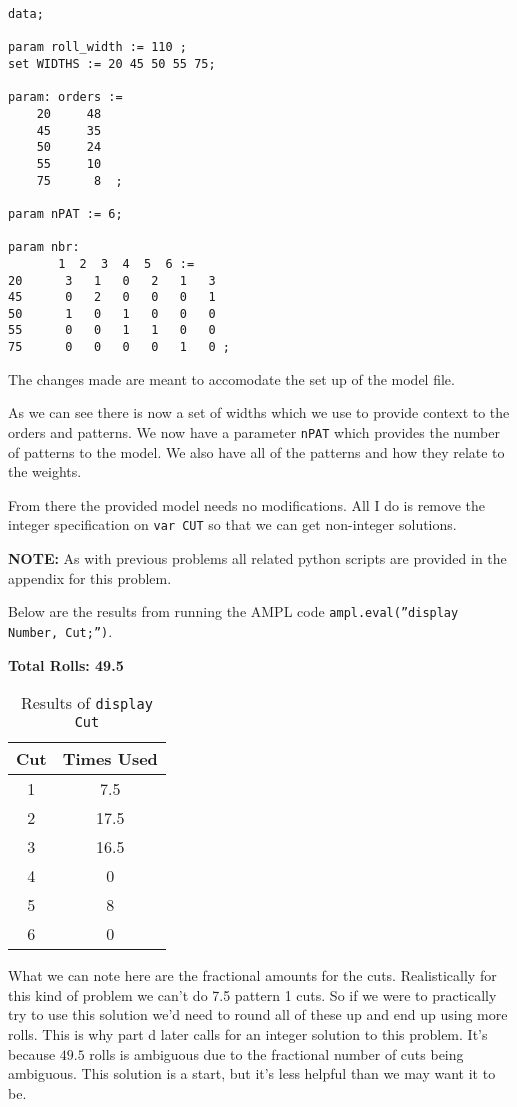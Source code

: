 \begin{lstlisting}
data;

param roll_width := 110 ;
set WIDTHS := 20 45 50 55 75;

param: orders :=
    20     48
    45     35
    50     24
    55     10
    75      8  ;

param nPAT := 6;

param nbr:
       1  2  3  4  5  6 :=
20      3   1   0   2   1   3
45      0   2   0   0   0   1
50      1   0   1   0   0   0
55      0   0   1   1   0   0
75      0   0   0   0   1   0 ;

\end{lstlisting}

The changes made are meant to accomodate the set up of the model file. 

As we can see there is now a set of widths which we use to provide context to the orders and patterns. We now have a parameter \texttt{nPAT} which provides the number of patterns to the model. We also have all of the patterns and how they relate to the weights. 

From there the provided model needs no modifications. All I do is remove the integer specification on \texttt{var CUT} so that we can get non-integer solutions. 

\noindent\textbf{NOTE:} As with previous problems all related python scripts are provided in the appendix for this problem.

Below are the results from running the AMPL code \texttt{ampl.eval(''display Number, Cut;'')}.

\textbf{Total Rolls: 49.5}

\begin{table}[!ht]
	\centering
	\begin{tabular}{|c|c|}
		\hline
		Cut & Times Used \\
		\hline 
		1 & 7.5 \\
		2 & 17.5 \\
		3 & 16.5 \\
		4 & 0 \\
		5 & 8 \\
		6 & 0 \\
		\hline
	\end{tabular}
	\caption{Results of \texttt{display Cut}}
	\label{tab:<+label+>}
\end{table}

What we can note here are the fractional amounts for the cuts. Realistically for this kind of problem we can't do 7.5 pattern 1 cuts. So if we were to practically try to use this solution we'd need to round all of these up and end up using more rolls. This is why part d later calls for an integer solution to this problem. It's because $49.5$ rolls is ambiguous due to the fractional number of cuts being ambiguous. This solution is a start, but it's less helpful than we may want it to be. 

